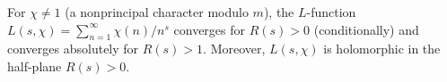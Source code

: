 For $\chi \neq 1$ (a nonprincipal character modulo $m$), the $L$-function $L(s,\chi) = \sum_{n=1}^\infty \chi(n)/n^s$ converges for $R(s) > 0$ (conditionally) and converges absolutely for $R(s) > 1$. Moreover, $L(s,\chi)$ is holomorphic in the half-plane $R(s) > 0$.
